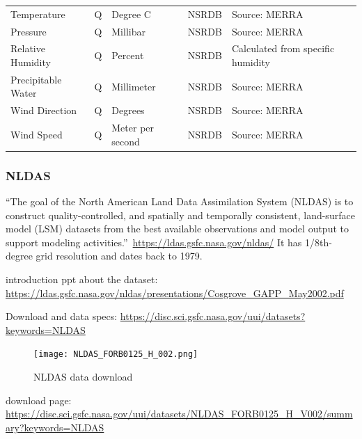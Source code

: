 \documentclass[12pt]{article}
\begin{document}
\begin{table}[h!]
\begin{tabular}{p{3cm}p{1cm}p{2cm}lp{7cm}}
Temperature        & Q    & Degree C              & NSRDB  & Source: MERRA                                                                                                                            \\
Pressure           & Q    & Millibar              & NSRDB  & Source: MERRA                                                                                                                            \\
Relative Humidity  & Q    & Percent               & NSRDB  & Calculated from specific humidity                                                                                                        \\
Precipitable Water & Q    & Millimeter            & NSRDB  & Source: MERRA                                                                                                                            \\
Wind Direction     & Q    & Degrees               & NSRDB  & Source: MERRA                                                                                                                            \\
Wind Speed         & Q    & Meter per second      & NSRDB  & Source: MERRA                                                                                                                           \\
                                                             \hline
\end{tabular}
\end{table}
\FloatBarrier
\subsubsection{NLDAS}
``The goal of the North American Land Data Assimilation System (NLDAS)
is to construct quality-controlled, and spatially and temporally
consistent, land-surface model (LSM) datasets from the best available
observations and model output to support modeling
activities.''~\url{https://ldas.gsfc.nasa.gov/nldas/} It has
1/8th-degree grid resolution and dates back to 1979.

introduction ppt about the dataset: \url{https://ldas.gsfc.nasa.gov/nldas/presentations/Cosgrove_GAPP_May2002.pdf}

Download and data specs: \url{https://disc.sci.gsfc.nasa.gov/uui/datasets?keywords=NLDAS}
\begin{figure}[h]
  \centering
  \texttt{[image: NLDAS\_FORB0125\_H\_002.png]}
  \caption{NLDAS data download}
  \label{fig:nldas}
\end{figure}
download page: \url{https://disc.sci.gsfc.nasa.gov/uui/datasets/NLDAS_FORB0125_H_V002/summary?keywords=NLDAS}
\end{document}

